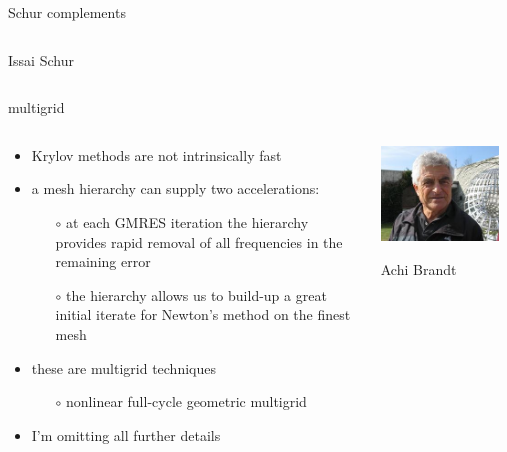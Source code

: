 \documentclass[10pt,hyperref,dvipsnames]{beamer}
\begin{document}
\begin{frame}{Schur complements}
\begin{columns}
\begin{column}{0.2\textwidth}
\hfill {\tiny Issai Schur}
\end{column}
\end{columns}
\end{frame}


\begin{frame}{multigrid}

\begin{columns}
\begin{column}{0.75\textwidth}
\begin{itemize}
\item Krylov methods are not intrinsically fast
\item a \alert{mesh hierarchy} can supply two accelerations:
    \begin{itemize}
    \item[$\circ$] at each GMRES iteration the hierarchy provides rapid removal of all frequencies in the remaining error
    \item[$\circ$] the hierarchy allows us to build-up a great initial iterate for Newton's method on the finest mesh
    \end{itemize}
\item these are \alert{multigrid} techniques
    \begin{itemize}
    \item[$\circ$] nonlinear full-cycle geometric multigrid
    \end{itemize}
\item I'm omitting all further details
\end{itemize}
\end{column}
\begin{column}{0.25\textwidth}
\hfill \includegraphics[width=0.9\textwidth]{figs/people/abrandt.jpg}

\hfill {\tiny Achi Brandt}
\end{column}
\end{columns}
\end{frame}
\end{document}
